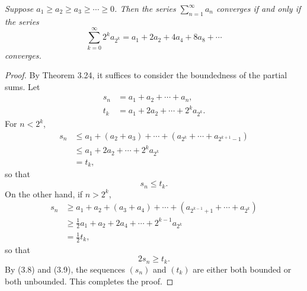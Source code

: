 \emph{Suppose $a_1 \ge a_2 \ge a_3 \ge \cdots \ge 0$. Then the series
$\sum_{n=1}^{\infty} a_n$ converges if and only if the series}
\begin{equation}
  \sum_{k=0}^{\infty} 2^ka_{2^k} = a_1 + 2a_2 + 4a_4 + 8a_8 + \cdots
  \tag{3.7}
\end{equation}
\emph{converges.}

\begin{proof}
By Theorem 3.24, it suffices to consider the boundedness of the partial sums.
Let
\begin{align*}
  s_n &= a_1 + a_2 + \cdots + a_n,\\
  t_k &= a_1 + 2a_2 + \cdots + 2^ka_{2^k}.
\end{align*}
For $n < 2^k$,
\begin{align*}
  s_n &\le a_1 + (a_2+a_3) + \cdots + (a_{2^k}+\cdots+a_{2^{k+1}-1})\\
      &\le a_1 + 2a_2 + \cdots + 2^ka_{2^k}\\
      &= t_k,
\end{align*}
so that
\begin{equation}
  s_n \le t_k. \tag{3.8}
\end{equation}
On the other hand, if $n > 2^k$,
\begin{align*}
  s_n &\ge a_1 + a_2 + (a_3+a_4) + \cdots +
        (a_{2^{k-1}+1}+\cdots+a_{2^k})\\
      &\ge \tfrac12a_1 + a_2 + 2a_4 + \cdots + 2^{k-1}a_{2^k}\\
      &= \tfrac12t_k,
\end{align*}
so that
\begin{equation}
  2s_n \ge t_k. \tag{3.9}
\end{equation}
By (3.8) and (3.9), the sequences $(s_n)$ and $(t_k)$ are either both bounded
or both unbounded. This completes the proof.
\end{proof}

